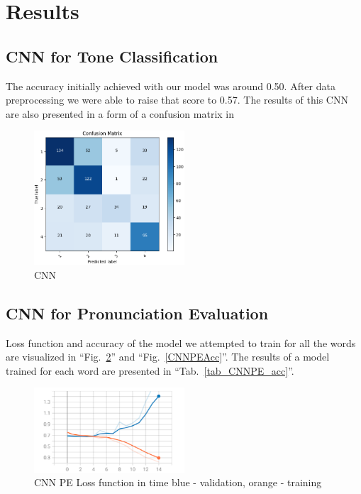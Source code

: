 \documentclass[conference]{IEEEtran}
\begin{document}
\section{Results}

\subsection{CNN for Tone Classification}

The accuracy initially achieved with our model was around 0.50. After data preprocessing we were able to raise that score to 0.57.
The results of this CNN are also presented in a form of a confusion matrix in 

\begin{figure}[hbtp]
    \centerline{\includegraphics[width=0.5\textwidth]{Figures/ToneCNN_Matrix.png}}
    \caption{CNN }
    \label{fig_ToneCNN_Mat} %
    \end{figure}

\subsection{CNN for Pronunciation Evaluation}

Loss function and accuracy of the model we attempted to train for all the words are visualized in ``Fig.~\ref{CNNPELoss}'' and ``Fig.~\ref{CNNPEAcc}''.
The results of a model trained for each word are presented in ``Tab.~\ref{tab_CNNPE_acc}''.

\begin{figure}[hbtp]
    \centerline{\includegraphics[width=0.5\textwidth]{Figures/Fig_CNN_PE_loss.png}}
    \caption{CNN PE Loss function in time \textbar \; blue - validation, orange - training}
    \label{CNNPELoss} %
    \end{figure}
\end{document}
